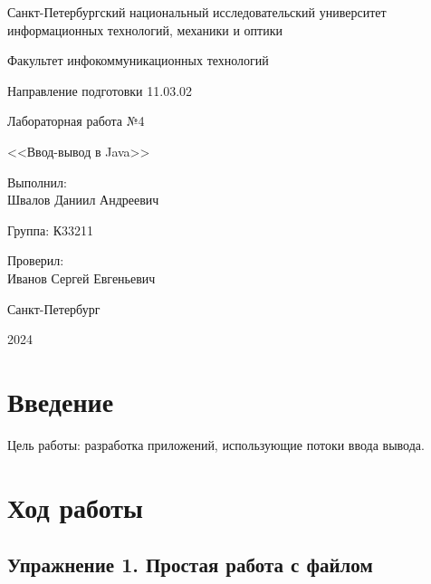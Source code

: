 \documentclass[a4paper, 14pt]{extarticle}
\begin{document}
\begin{titlepage}
  \vspace{0pt plus2fill}
  \noindent

  \vspace{0pt plus6fill}
  \begin{center}
    Санкт-Петербургский национальный исследовательский университет
    информационных технологий, механики и оптики

    \vspace{0pt plus3fill}

    Факультет инфокоммуникационных технологий

    Направление подготовки 11.03.02

    \vspace{0pt plus2fill}

    Лабораторная работа №4

    <<Ввод-вывод в Java>>

  \end{center}

  \vspace{0pt plus6fill}
  \begin{flushright}
    Выполнил: \\
    Швалов Даниил Андреевич

    Группа: К33211

    Проверил: \\
    Иванов Сергей Евгеньевич
  \end{flushright}

  \vspace{0pt plus5fill}
  \begin{center}
    Санкт-Петербург

    2024
  \end{center}
\end{titlepage}

\setcounter{page}{2}

\section*{Введение}

Цель работы: разработка приложений, использующие потоки ввода вывода.

\section*{Ход работы}

\subsection*{Упражнение 1. Простая работа с файлом}
\end{document}
